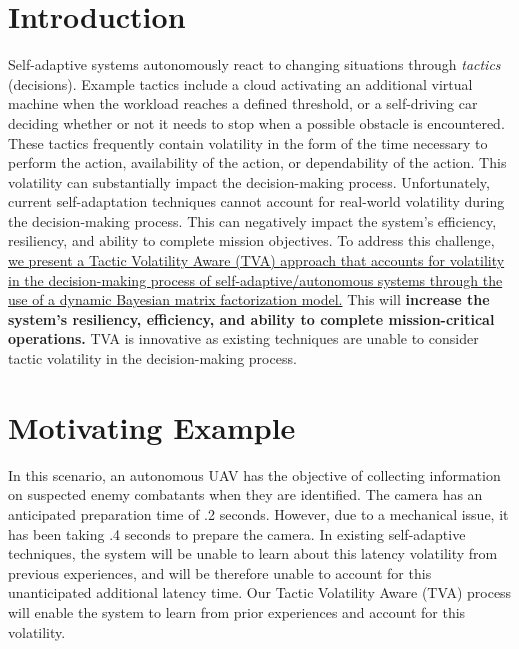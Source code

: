 \documentclass{article}
\title{\Title}
\author{
	TPOC: Daniel E. Krutz and Qi Yu; \{dxkvse, qi.yu\}@rit.edu\\
}
\date{} %
\begin{document}
\maketitle
\vspace{-10mm}
\section{Introduction}
\vspace{-2mm}


Self-adaptive systems autonomously react to changing situations through \emph{tactics} (decisions). Example tactics include a cloud activating an additional virtual machine when the workload reaches a defined threshold, or a self-driving car deciding whether or not it needs to stop when a possible obstacle is encountered. These tactics frequently contain volatility in the form of the time necessary to perform the action, availability of the action, or dependability of the action. This volatility can substantially impact the decision-making process. Unfortunately, current self-adaptation techniques cannot account for real-world volatility during the decision-making process. This can negatively impact the system's efficiency, resiliency, and ability to complete mission objectives. To address this challenge, \ul{we present a Tactic Volatility Aware (TVA) approach that accounts for volatility in the decision-making process of self-adaptive/autonomous systems through the use of a dynamic Bayesian matrix factorization model.} This will \textbf{increase the system's resiliency, efficiency, and ability to complete mission-critical operations.} TVA is innovative as existing techniques are unable to consider tactic volatility in the decision-making process. %

\vspace{-2mm}
\section{Motivating Example}
\vspace{-2mm}
In this scenario, an autonomous UAV has the objective of collecting information on suspected enemy combatants when they are identified. The camera has an anticipated preparation time of .2 seconds. However, due to a mechanical issue, it has been taking .4 seconds to prepare the camera. In existing self-adaptive techniques, the system will be unable to learn about this latency volatility from previous experiences, and will be therefore unable to account for this unanticipated additional latency time. Our Tactic Volatility Aware (TVA) process will enable the system to learn from prior experiences and account for this volatility.
\end{document}
